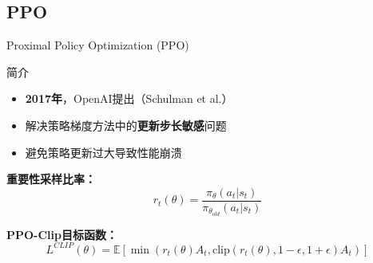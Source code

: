 \documentclass{beamer}
\begin{document}
\subsection{PPO}
\begin{frame}{Proximal Policy Optimization (PPO)}
    \begin{block}{简介}
        \begin{itemize}
            \item \textbf{2017年}，OpenAI提出（Schulman et al.）
            \item 解决策略梯度方法中的\textbf{更新步长敏感}问题
            \item 避免策略更新过大导致性能崩溃
        \end{itemize}
    \end{block}
    
    \vspace{0.3cm}
    
    \textbf{重要性采样比率：}
    \[ r_t(\theta) = \frac{\pi_\theta(a_t|s_t)}{\pi_{\theta_{old}}(a_t|s_t)} \]
    
    \vspace{0.3cm}
    
    \textbf{PPO-Clip目标函数：}
    \[ L^{CLIP}(\theta) = \mathbb{E} \left[ \min\left( r_t(\theta) A_t, \text{clip}(r_t(\theta), 1-\epsilon, 1+\epsilon) A_t \right) \right] \]
    
    \cite{schulman2017proximalpolicyoptimizationalgorithms}
\end{frame}
\end{document}
